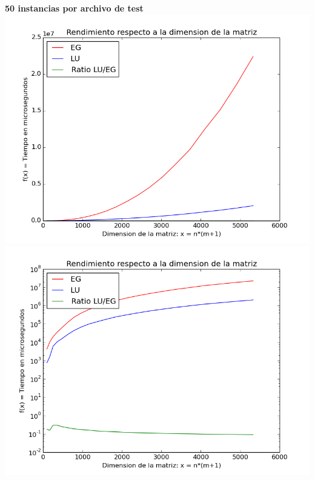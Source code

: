 \begin{center}
\textbf{50 instancias por archivo de test}\\
\includegraphics[scale=0.35]{experimentos2a_2b/gauss_vs_lu_50_inst/gauss_vs_lu_time_consumed_abs.png}
\includegraphics[scale=0.35]{experimentos2a_2b/gauss_vs_lu_50_inst/gauss_vs_lu_time_consumed_log.png}
\end{center}

